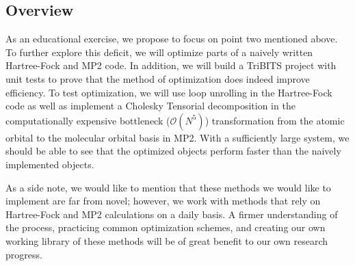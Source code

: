\documentclass{article}
\begin{document}
\subsection{Overview}
\quad As an educational exercise, we propose to focus on point two mentioned above. To further explore this deficit, we will optimize parts of a naively written Hartree-Fock and MP2 code.  In addition, we will build a TriBITS project with unit tests to prove that the method of optimization does indeed improve efficiency.  
To test optimization, we will use loop unrolling in the Hartree-Fock code as well as implement a Cholesky Tensorial decomposition in the computationally expensive bottleneck ($\mathcal{O}(N^{5})$) transformation from the atomic orbital to the molecular orbital basis in MP2.  With a sufficiently large system, we should be able to see that the optimized objects perform faster than the naively implemented objects.\newline 
\par \quad As a side note, we would like to mention that these methods we would like to implement are far from novel; however, we work with methods that rely on Hartree-Fock and MP2 calculations on a daily basis. A firmer understanding of the process, practicing common optimization schemes, and creating our own working library of these methods will be of great benefit to our own research progress.  
\end{document}
